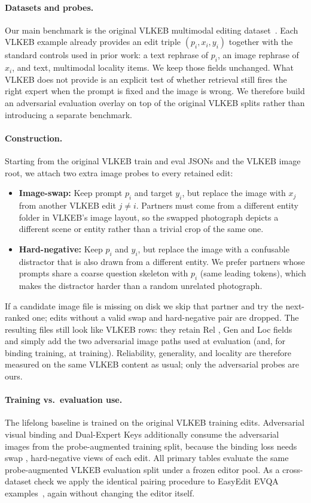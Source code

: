 \documentclass[letterpaper]{article} %
\begin{document}
\paragraph{Datasets and probes.}
\label{sec:data-prep}
Our main benchmark is the original VLKEB multimodal editing dataset~\cite{huang2024vlkeb}.
Each VLKEB example already provides an edit triple $(p_i,x_i,y_i)$ together with the standard controls used in prior work: a text rephrase of $p_i$, an image rephrase of $x_i$, and text, multimodal locality items.
We keep those fields unchanged.
What VLKEB does not provide is an explicit test of whether retrieval still fires the right expert when the prompt is fixed and the image is wrong.
We therefore build an adversarial evaluation overlay on top of the original VLKEB splits rather than introducing a separate benchmark.

\paragraph{Construction.}
Starting from the original VLKEB train and eval JSONs and the VLKEB image root, we attach two extra image probes to every retained edit:
\begin{itemize}
\item \textbf{Image-swap:} Keep prompt $p_i$ and target $y_i$, but replace the image with $x_j$ from another VLKEB edit $j\neq i$.
Partners must come from a different entity folder in VLKEB's image layout, so the swapped photograph depicts a different scene or entity rather than a trivial crop of the same one.
\item \textbf{Hard-negative:} Keep $p_i$ and $y_i$, but replace the image with a confusable distractor that is also drawn from a different entity.
We prefer partners whose prompts share a coarse question skeleton with $p_i$ (same leading tokens), which makes the distractor harder than a random unrelated photograph.
\end{itemize}
If a candidate image file is missing on disk we skip that partner and try the next-ranked one; edits without a valid swap and hard-negative pair are dropped.
The resulting files still look like VLKEB rows: they retain Rel , Gen and Loc fields and simply add the two adversarial image paths used at evaluation (and, for binding training, at training).
Reliability, generality, and locality are therefore measured on the same VLKEB content as usual; only the adversarial probes are ours.

\paragraph{Training vs.\ evaluation use.}
The lifelong baseline is trained on the original VLKEB training edits.
Adversarial visual binding and Dual-Expert Keys additionally consume the adversarial images from the probe-augmented training split, because the binding loss needs swap , hard-negative views of each edit.
All primary tables evaluate the same probe-augmented VLKEB evaluation split under a frozen editor pool.
As a cross-dataset check we apply the identical pairing procedure to EasyEdit EVQA examples~\cite{wang2024easyedit}, again without changing the editor itself.
\end{document}
